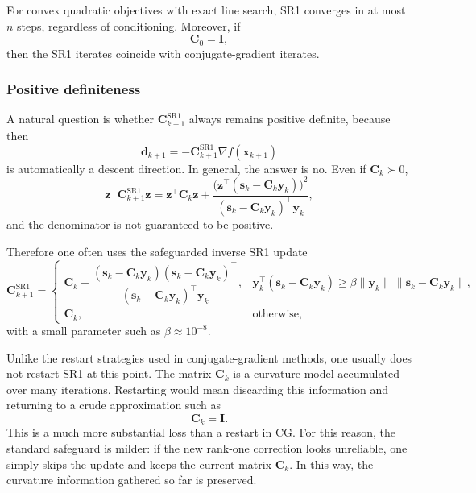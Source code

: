 For convex quadratic objectives with exact line search, SR1 converges in at
most $n$ steps, regardless of conditioning. Moreover, if
\[
  \mathbf{C}_0=\mathbf{I},
\]
then the SR1 iterates coincide with conjugate-gradient iterates. 


\subsubsection{Positive definiteness}
A natural question is whether $\mathbf{C}_{k+1}^{\mathrm{SR1}}$ always remains
positive definite, because then
\[
  \mathbf{d}_{k+1}=-\mathbf{C}_{k+1}^{\mathrm{SR1}}\nabla f(\mathbf{x}_{k+1})
\]
is automatically a descent direction. In general, the answer is no. Even if
$\mathbf{C}_k\succ 0$,
\[
  \mathbf{z}^\top \mathbf{C}_{k+1}^{\mathrm{SR1}}\mathbf{z}
  =\mathbf{z}^\top \mathbf{C}_k\mathbf{z}
  +\frac{\bigl(\mathbf{z}^\top(\mathbf{s}_k-\mathbf{C}_k\mathbf{y}_k)\bigr)^2}
  {(\mathbf{s}_k-\mathbf{C}_k\mathbf{y}_k)^\top \mathbf{y}_k},
\]
and the denominator is not guaranteed to be positive.

Therefore one often uses the safeguarded inverse SR1 update
\begin{equation}
  \label{eq:ch6-sr1-skip}
  \mathbf{C}_{k+1}^{\mathrm{SR1}}
  =
  \begin{cases}
    \mathbf{C}_k
    +\dfrac{(\mathbf{s}_k-\mathbf{C}_k\mathbf{y}_k)
    (\mathbf{s}_k-\mathbf{C}_k\mathbf{y}_k)^\top}
    {(\mathbf{s}_k-\mathbf{C}_k\mathbf{y}_k)^\top \mathbf{y}_k},
    &
    \mathbf{y}_k^\top(\mathbf{s}_k-\mathbf{C}_k\mathbf{y}_k)
    \ge \beta \|\mathbf{y}_k\|
    \,\|\mathbf{s}_k-\mathbf{C}_k\mathbf{y}_k\|,
    \\[6pt]
    \mathbf{C}_k,
    & \text{otherwise},
  \end{cases}
\end{equation}
with a small parameter such as $\beta\approx 10^{-8}$.

Unlike the restart strategies used in conjugate-gradient methods, one usually
does not restart SR1 at this point. The matrix $\mathbf{C}_k$ is a curvature
model accumulated over many iterations. Restarting would mean discarding this
information and returning to a crude approximation such as
\[
  \mathbf{C}_k=\mathbf{I}.
\]
This is a much more substantial loss than a restart in CG. For this reason, the
standard safeguard is milder: if the new rank-one correction looks unreliable,
one simply skips the update and keeps the current matrix $\mathbf{C}_k$. In
this way, the curvature information gathered so far is preserved.

